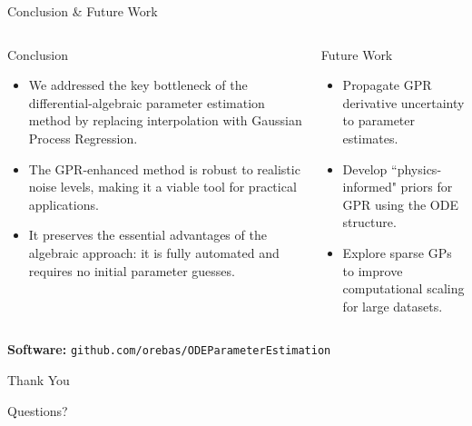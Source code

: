 \documentclass[aspectratio=169]{beamer}
\begin{document}
\begin{frame}[shrink]{Conclusion \& Future Work}
    \begin{columns}[T]
        \begin{column}{0.55\textwidth}
            \begin{block}{Conclusion}
                \begin{itemize}
                    \item We addressed the key bottleneck of the differential-algebraic parameter estimation method by replacing interpolation with Gaussian Process Regression.
                    \item The GPR-enhanced method is robust to realistic noise levels, making it a viable tool for practical applications.
                    \item It preserves the essential advantages of the algebraic approach: it is fully automated and requires no initial parameter guesses.
                \end{itemize}
            \end{block}
        \end{column}
        \begin{column}{0.4\textwidth}
            \begin{block}{Future Work}
                \begin{itemize}
                    \item Propagate GPR derivative uncertainty to parameter estimates.
                    \item Develop ``physics-informed" priors for GPR using the ODE structure.
                    \item Explore sparse GPs to improve computational scaling for large datasets.
                \end{itemize}
            \end{block}
        \end{column}
    \end{columns}
    \vspace{1em}
    \begin{center}
        \small
        \textbf{Software:} \texttt{github.com/orebas/ODEParameterEstimation}
    \end{center}
\end{frame}

\begin{frame}
    \begin{center}
        \huge Thank You
        \vspace{2em}
        
        \Large Questions?
    \end{center}
\end{frame}
\end{document}
